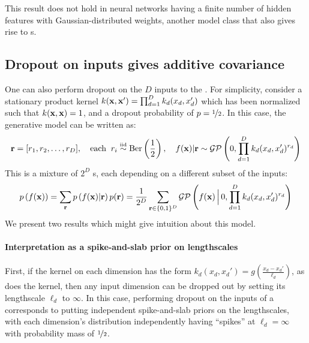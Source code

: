 \documentclass{article} %
\begin{document}
This result does not hold in neural networks having a finite number of hidden features with Gaussian-distributed weights, another model class that also gives rise to \gp{}s.



\subsection{Dropout on inputs gives additive covariance}
One can also perform dropout on the $D$ inputs to the \gp{}.
For simplicity, consider a stationary product kernel ${k({\bf{x}}, {\bf{x}}') = \prod_{d=1}^D k_d(x_d, x_d')}$ which has been normalized such that $k({\bf{x}}, {\bf{x}}) = 1$, and a dropout probability of $p = \nicefrac{1}{2}$.
In this case, the generative model can be written as:
%
\begin{align}
\vr = [r_1, r_2, \dots, r_D], \quad \textnormal{each} \;\; r_i \simiid \textnormal{Ber} \left( \frac{1}{2} \right), \quad f(\vx) | \vr \sim \GP \left( 0, \prod_{d=1}^D k_d(x_d, x_d')^{r_d} \right)
\end{align}
%
This is a mixture of $2^D$ \gp{}s, each depending on a different subset of the inputs:
%
\begin{align}
p \left( f({\bf{x}}) \right) = 
\sum_{{\bf{r}}} p \left( f({\bf{x}}) | {\bf{r}} \right) p( {\bf{r}}) = 
\frac{1}{2^D} \sum_{{\bf{r}} \in \{0,1\}^D}  \mathcal{GP} \left(f({\bf{x}}) \,\Big|\, 0, \prod_{d=1}^D k_d(x_d, x_d')^{r_d} \right)
\label{eq:dropout-mixture}
\end{align}
We present two results which might give intuition about this model.

\paragraph{Interpretation as a spike-and-slab prior on lengthscales}
First, if the kernel on each dimension has the form ${k_d(x_d, x_d') = g \left( \frac{x_d - x_d'}{\ell_d} \right)}$, as does the \kSE{} kernel, then any input dimension can be dropped out by setting its lengthscale $\ell_d$ to $\infty$.
In this case, performing dropout on the inputs of a \gp{} corresponds to putting independent spike-and-slab priors on the lengthscales, with each dimension's distribution independently having ``spikes'' at $\ell_d = \infty$ with probability mass of $\nicefrac{1}{2}$.
\end{document}
